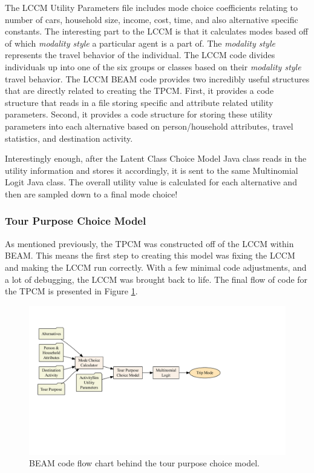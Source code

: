 \documentclass[12pt, oneside, openright]{byuthesis}
\begin{document}
The LCCM Utility Parameters file includes mode choice coefficients relating to number of cars, household size, income, cost, time, and also alternative specific constants. The interesting part to the LCCM is that it calculates modes based off of which \emph{modality style} a particular agent is a part of. The \emph{modality style} represents the travel behavior of the individual. The LCCM code divides individuals up into one of the six groups or classes based on their \emph{modality style} travel behavior. The LCCM BEAM code provides two incredibly useful structures that are directly related to creating the TPCM. First, it provides a code structure that reads in a file storing specific and attribute related utility parameters. Second, it provides a code structure for storing these utility parameters into each alternative based on person/household attributes, travel statistics, and destination activity.

Interestingly enough, after the Latent Class Choice Model Java class reads in the utility information and stores it accordingly, it is sent to the same Multinomial Logit Java class. The overall utility value is calculated for each alternative and then are sampled down to a final mode choice!

\hypertarget{tour-purpose-choice-model}{%
\subsubsection{Tour Purpose Choice Model}\label{tour-purpose-choice-model}}

As mentioned previously, the TPCM was constructed off of the LCCM within BEAM. This means the first step to creating this model was fixing the LCCM and making the LCCM run correctly. With a few minimal code adjustments, and a lot of debugging, the LCCM was brought back to life. The final flow of code for the TPCM is presented in Figure \ref{fig:tpcmflow}.

\begin{figure}

{\centering \includegraphics[width=650px]{thesis_files/figure-latex/tpcmflow-1} 

}

\caption{BEAM code flow chart behind the tour purpose choice model.}\label{fig:tpcmflow}
\end{figure}
\end{document}
